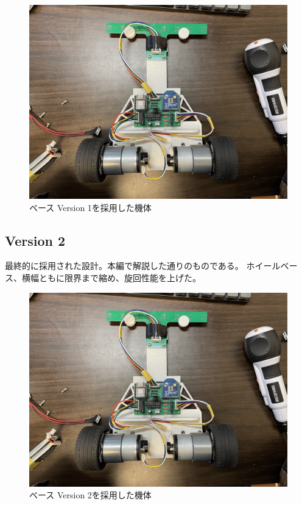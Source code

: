 \documentclass{ltjsreport}
\begin{document}
\begin{figure}[bth]
  \centering
  \includegraphics[keepaspectratio, scale=0.11]
       {img/ver1_machine.jpg}
  \caption{ベース Version 1を採用した機体}
  \label{fig:v1_machine}
 \end{figure}

\subsection{Version 2}
最終的に採用された設計。本編で解説した通りのものである。
ホイールベース、横幅ともに限界まで縮め、旋回性能を上げた。
\begin{figure}[bth]
  \centering
  \includegraphics[keepaspectratio, scale=0.11]
       {img/ver1_machine.jpg}
  \caption{ベース Version 2を採用した機体}
  \label{fig:v2_machine}
 \end{figure}
\end{document}

